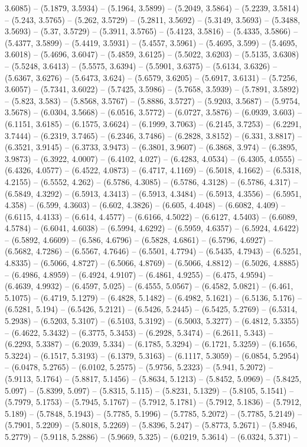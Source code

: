 3.6085) -- (5.1879, 3.5934) -- (5.1964, 3.5899) -- (5.2049, 3.5864) -- (5.2239, 3.5814) -- (5.243, 3.5765) -- (5.262, 3.5729) -- (5.2811, 3.5692) -- (5.3149, 3.5693) -- (5.3488, 3.5693) -- (5.37, 3.5729) -- (5.3911, 3.5765) -- (5.4123, 3.5816) -- (5.4335, 3.5866) -- (5.4377, 3.5899) -- (5.4419, 3.5931) -- (5.4557, 3.5961) -- (5.4695, 3.599) -- (5.4695, 3.6018) -- (5.4696, 3.6047) -- (5.4859, 3.6125) -- (5.5022, 3.6203) -- (5.5135, 3.6308) -- (5.5248, 3.6413) -- (5.5575, 3.6394) -- (5.5901, 3.6375) -- (5.6134, 3.6326) -- (5.6367, 3.6276) -- (5.6473, 3.624) -- (5.6579, 3.6205) -- (5.6917, 3.6131) -- (5.7256, 3.6057) -- (5.7341, 3.6022) -- (5.7425, 3.5986) -- (5.7658, 3.5939) -- (5.7891, 3.5892) -- (5.823, 3.583) -- (5.8568, 3.5767) -- (5.8886, 3.5727) -- (5.9203, 3.5687) -- (5.9754, 3.5678) -- (6.0304, 3.5668) -- (6.0516, 3.5772) -- (6.0727, 3.5876) -- (6.0939, 3.603) -- (6.1151, 3.6185) -- (6.1575, 3.6624) -- (6.1999, 3.7063) -- (6.2145, 3.7253) -- (6.2291, 3.7444) -- (6.2319, 3.7465) -- (6.2346, 3.7486) -- (6.2828, 3.8152) -- (6.331, 3.8817) -- (6.3521, 3.9145) -- (6.3733, 3.9473) -- (6.3801, 3.9607) -- (6.3868, 3.974) -- (6.3895, 3.9873) -- (6.3922, 4.0007) -- (6.4102, 4.027) -- (6.4283, 4.0534) -- (6.4305, 4.0555) -- (6.4326, 4.0577) -- (6.4522, 4.0873) -- (6.4717, 4.1169) -- (6.5018, 4.1662) -- (6.5318, 4.2155) -- (6.5552, 4.262) -- (6.5786, 4.3085) -- (6.5786, 4.3128) -- (6.5786, 4.317) -- (6.5849, 4.3292) -- (6.5913, 4.3413) -- (6.5913, 4.3484) -- (6.5913, 4.3556) -- (6.5951, 4.358) -- (6.599, 4.3603) -- (6.602, 4.3826) -- (6.605, 4.4048) -- (6.6082, 4.409) -- (6.6115, 4.4133) -- (6.614, 4.4577) -- (6.6166, 4.5022) -- (6.6127, 4.5403) -- (6.6089, 4.5784) -- (6.6041, 4.6038) -- (6.5994, 4.6292) -- (6.5959, 4.6357) -- (6.5924, 4.6422) -- (6.5892, 4.6609) -- (6.586, 4.6796) -- (6.5828, 4.6861) -- (6.5796, 4.6927) -- (6.5682, 4.7286) -- (6.5567, 4.7646) -- (6.5501, 4.7794) -- (6.5435, 4.7943) -- (6.5251, 4.8335) -- (6.5066, 4.8727) -- (6.5066, 4.8769) -- (6.5066, 4.8812) -- (6.5026, 4.8885) -- (6.4986, 4.8959) -- (6.4924, 4.9107) -- (6.4861, 4.9255) -- (6.475, 4.9594) -- (6.4639, 4.9932) -- (6.4597, 5.025) -- (6.4555, 5.0567) -- (6.4582, 5.0821) -- (6.461, 5.1075) -- (6.4719, 5.1279) -- (6.4828, 5.1482) -- (6.4982, 5.1621) -- (6.5136, 5.176) -- (6.5281, 5.194) -- (6.5426, 5.2121) -- (6.5426, 5.2445) -- (6.5425, 5.2769) -- (6.5314, 5.2938) -- (6.5203, 5.3107) -- (6.5103, 5.3192) -- (6.5003, 5.3277) -- (6.4812, 5.3355) -- (6.4622, 5.3432) -- (6.3775, 5.3453) -- (6.2928, 5.3474) -- (6.2611, 5.343) -- (6.2293, 5.3387) -- (6.2039, 5.334) -- (6.1785, 5.3294) -- (6.1721, 5.3259) -- (6.1656, 5.3224) -- (6.1517, 5.3193) -- (6.1379, 5.3163) -- (6.1117, 5.3059) -- (6.0854, 5.2954) -- (6.0478, 5.2765) -- (6.0102, 5.2575) -- (5.9756, 5.2323) -- (5.941, 5.2072) -- (5.9113, 5.1764) -- (5.8817, 5.1456) -- (5.8634, 5.1213) -- (5.8452, 5.0969) -- (5.8425, 5.097) -- (5.8399, 5.097) -- (5.8315, 5.115) -- (5.8231, 5.1329) -- (5.8105, 5.1541) -- (5.7979, 5.1753) -- (5.7945, 5.1767) -- (5.7912, 5.1781) -- (5.7912, 5.1836) -- (5.7912, 5.189) -- (5.7848, 5.1943) -- (5.7785, 5.1996) -- (5.7785, 5.2072) -- (5.7785, 5.2149) -- (5.7901, 5.2209) -- (5.8018, 5.2269) -- (5.8396, 5.247) -- (5.8773, 5.2671) -- (5.8946, 5.2779) -- (5.9118, 5.2886) -- (5.9669, 5.325) -- (6.0219, 5.3614) -- (6.0324, 5.371) -- 